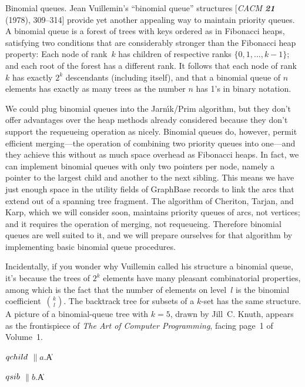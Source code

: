 Binomial queues.
Jean Vuillemin's ``binomial queue'' structures [{\sl CACM\/ \bf21} (1978),
309--314] provide yet another appealing way to maintain priority queues.
A binomial queue is a forest of trees with keys ordered as in Fibonacci
heaps, satisfying two conditions that are considerably stronger than
the Fibonacci heap property: Each node of rank~$k$ has children of
respective ranks $\{0,1,\ldots,k-1\}$; and each root of the forest
has a different rank. It follows that each node of rank~$k$ has exactly
$2^k$ descendants (including itself), and that a binomial queue of
$n$ elements has exactly as many trees as the number $n$ has 1's in
binary notation.

We could plug binomial queues into the Jarn{\'\i}k/Prim algorithm, but
they don't offer advantages over the heap methods already considered
because they don't support the requeueing operation as nicely.
Binomial queues do, however, permit efficient merging---the operation
of combining two priority queues into one---and they achieve this
without as much space overhead as Fibonacci heaps. In fact, we can
implement binomial queues with only two pointers per node, namely a
pointer to the largest child and another to the next sibling. This means we
have just enough space in the utility fields of GraphBase  records
to link the arcs that extend out of a spanning tree fragment. The
algorithm of Cheriton, Tarjan, and Karp, which we will consider
soon, maintains priority queues of arcs, not vertices; and it
requires the operation of merging, not requeueing. Therefore binomial
queues are well suited to it, and we will prepare ourselves for that
algorithm by implementing basic binomial queue procedures.

Incidentally, if you wonder why Vuillemin called his structure a
binomial queue, it's because the trees of $2^k$ elements have many
pleasant combinatorial properties, among which is the fact that the
number of elements on level~$l$ is the binomial coefficient~$k\choose
l$. The backtrack tree for subsets of a $k$-set has the same
structure. A picture of a binomial-queue tree with $k=5$, drawn by
Jill~C. Knuth, appears as the frontispiece of {\sl The Art of Computer
Programming}, facing page~1 of Volume~1.

\Y\B\4\D$\\{qchild}$ \5
$\|a.{}$\|A\par
\B\4\D$\\{qsib}$ \5
$\|b.{}$\|A\par
\fi

